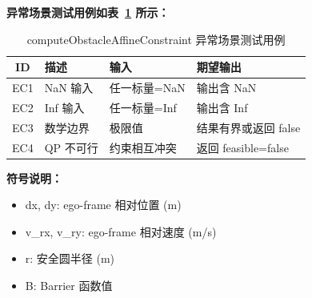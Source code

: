 \documentclass[a4paper,10pt]{article}
\begin{document}
\noindent\textbf{异常场景测试用例如表~\ref{tab:abnormal_computeObstacleAffineConstraint} 所示：}
\begin{table}[h]
\centering
\caption{computeObstacleAffineConstraint 异常场景测试用例}
\label{tab:abnormal_computeObstacleAffineConstraint}
\begin{tabular}{|c|p{3.5cm}|p{3.5cm}|p{3.5cm}|}
\hline
ID & 描述 & 输入 & 期望输出 \\ \hline
  EC1 & NaN 输入 & 任一标量=NaN & 输出含 NaN \\ \hline
  EC2 & Inf 输入 & 任一标量=Inf & 输出含 Inf \\ \hline
  EC3 & 数学边界 & 极限值 & 结果有界或返回 false \\ \hline
  EC4 & QP 不可行 & 约束相互冲突 & 返回 feasible=false \\ \hline
\end{tabular}
\end{table}

\noindent\textbf{符号说明：}
\begin{itemize}
  \item dx, dy: ego-frame 相对位置 (m)
  \item v\_rx, v\_ry: ego-frame 相对速度 (m/s)
  \item r: 安全圆半径 (m)
  \item B: Barrier 函数值
\end{itemize}
\end{document}
